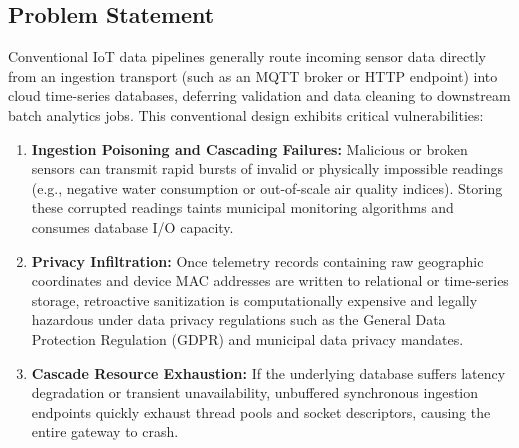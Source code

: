 \subsection{Problem Statement}
Conventional IoT data pipelines generally route incoming sensor data directly from an ingestion transport (such as an MQTT broker or HTTP endpoint) into cloud time-series databases, deferring validation and data cleaning to downstream batch analytics jobs. This conventional design exhibits critical vulnerabilities:
\begin{enumerate}[label=(\alph*)]
    \item \textbf{Ingestion Poisoning and Cascading Failures:} Malicious or broken sensors can transmit rapid bursts of invalid or physically impossible readings (e.g., negative water consumption or out-of-scale air quality indices). Storing these corrupted readings taints municipal monitoring algorithms and consumes database I/O capacity.
    \item \textbf{Privacy Infiltration:} Once telemetry records containing raw geographic coordinates and device MAC addresses are written to relational or time-series storage, retroactive sanitization is computationally expensive and legally hazardous under data privacy regulations such as the General Data Protection Regulation (GDPR) and municipal data privacy mandates.
    \item \textbf{Cascade Resource Exhaustion:} If the underlying database suffers latency degradation or transient unavailability, unbuffered synchronous ingestion endpoints quickly exhaust thread pools and socket descriptors, causing the entire gateway to crash.
\end{enumerate}

